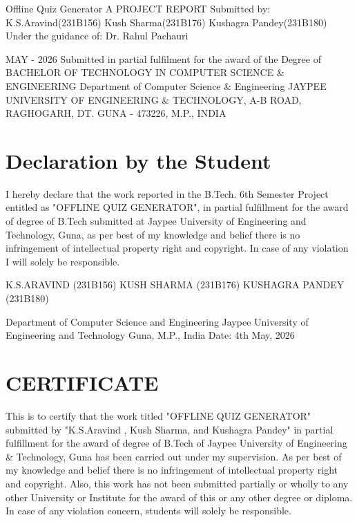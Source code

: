 \documentclass[12pt,a4paper]{report}
\begin{document}
﻿Offline Quiz Generator
A PROJECT REPORT
Submitted by:
K.S.Aravind(231B156)
Kush Sharma(231B176)
Kushagra Pandey(231B180)
Under the guidance of: Dr. Rahul Pachauri


MAY - 2026
Submitted in partial fulfilment for the award of the Degree of
BACHELOR OF TECHNOLOGY
IN
COMPUTER SCIENCE \& ENGINEERING
Department of Computer Science \& Engineering
JAYPEE UNIVERSITY OF ENGINEERING \& TECHNOLOGY,
A-B ROAD, RAGHOGARH, DT. GUNA - 473226, M.P., INDIA




\chapter*{Declaration by the Student}


I hereby declare that the work reported in the B.Tech. 6th Semester Project entitled as "OFFLINE QUIZ GENERATOR", in partial fulfillment for the award of degree of B.Tech submitted at Jaypee University of Engineering and Technology, Guna, as per best of my knowledge and belief there is no infringement of intellectual property right and copyright. In case of any violation I will solely be responsible.






K.S.ARAVIND (231B156)
KUSH SHARMA (231B176)
KUSHAGRA PANDEY (231B180)



Department of Computer Science and Engineering
Jaypee University of Engineering and Technology
Guna, M.P., India
Date: 4th May, 2026






\chapter*{CERTIFICATE}
This is to certify that the work titled "OFFLINE QUIZ GENERATOR" submitted by "K.S.Aravind , Kush Sharma, and Kushagra Pandey" in partial fulfillment for the award of degree of B.Tech of Jaypee University of Engineering \& Technology, Guna has been carried out under my supervision. As per best of my knowledge and belief there is no infringement of intellectual property right and copyright. Also, this work has not been submitted partially or wholly to any other University or Institute for the award of this or any other degree or diploma. In case of any violation concern, students will solely be responsible.
\end{document}
